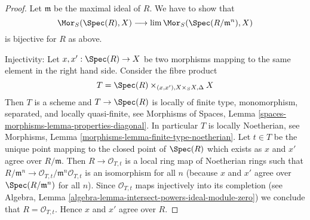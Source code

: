 \begin{proof}
Let $\mathfrak m$ be the maximal ideal of $R$. We have to show that
$$
\Mor_S(\Spec(R), X) \longrightarrow \lim \Mor_S(\Spec(R/\mathfrak m^n), X)
$$
is bijective for $R$ as above.

\medskip\noindent
Injectivity: Let $x, x' : \Spec(R) \to X$
be two morphisms mapping to the same element in the right hand side.
Consider the fibre product
$$
T = \Spec(R) \times_{(x, x'), X \times_S X, \Delta} X
$$
Then $T$ is a scheme and $T \to \Spec(R)$ is locally of finite type,
monomorphism, separated, and locally quasi-finite, see
Morphisms of Spaces, Lemma \ref{spaces-morphisms-lemma-properties-diagonal}.
In particular $T$ is locally Noetherian, see
Morphisms, Lemma \ref{morphisms-lemma-finite-type-noetherian}.
Let $t \in T$ be the unique point mapping to the closed point of $\Spec(R)$
which exists as $x$ and $x'$ agree over $R/\mathfrak m$. Then
$R \to \mathcal{O}_{T, t}$ is a local ring map of Noetherian rings such that
$R/\mathfrak m^n \to \mathcal{O}_{T, t}/\mathfrak m^n\mathcal{O}_{T, t}$
is an isomorphism for all $n$ (because $x$ and $x'$ agree over
$\Spec(R/\mathfrak m^n)$ for all $n$). Since $\mathcal{O}_{T, t}$
maps injectively into its completion (see
Algebra, Lemma \ref{algebra-lemma-intersect-powers-ideal-module-zero})
we conclude that $R = \mathcal{O}_{T, t}$. Hence $x$ and $x'$ agree
over $R$.


\end{proof}
